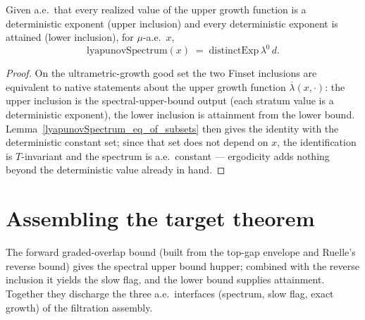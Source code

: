 \begin{theorem}\label{lyapunovSpectrum_eq_distinctExp_of_lambdaBar}
  \leanok
  Given a.e.\ that every realized value of the upper growth function is a deterministic exponent
  (upper inclusion) and every deterministic exponent is attained (lower inclusion), for
  \(\mu\)-a.e.\ \(x\),
  \[
    \mathrm{lyapunovSpectrum}(x) \;=\; \mathrm{distinctExp}\,\lambda^0\,d .
  \]
\end{theorem}
\begin{proof}\leanok
  On the ultrametric-growth good set the two Finset inclusions are equivalent to native statements
  about the upper growth function \(\overline\lambda(x,\cdot)\): the upper inclusion is the
  spectral-upper-bound output (each stratum value is a deterministic exponent), the lower inclusion
  is attainment from the lower bound. Lemma~\ref{lyapunovSpectrum_eq_of_subsets} then gives the
  identity with the deterministic constant set; since that set does not depend on \(x\), the
  identification is \(T\)-invariant and the spectrum is a.e.\ constant --- ergodicity adds nothing
  beyond the deterministic value already in hand.
\end{proof}

\section{Assembling the target theorem}

The forward graded-overlap bound (built from the top-gap envelope and Ruelle's reverse bound) gives
the spectral upper bound \(\mathrm{hupper}\); combined with the reverse inclusion it yields the slow
flag, and the lower bound supplies attainment. Together they discharge the three a.e.\ interfaces
(spectrum, slow flag, exact growth) of the filtration assembly.

